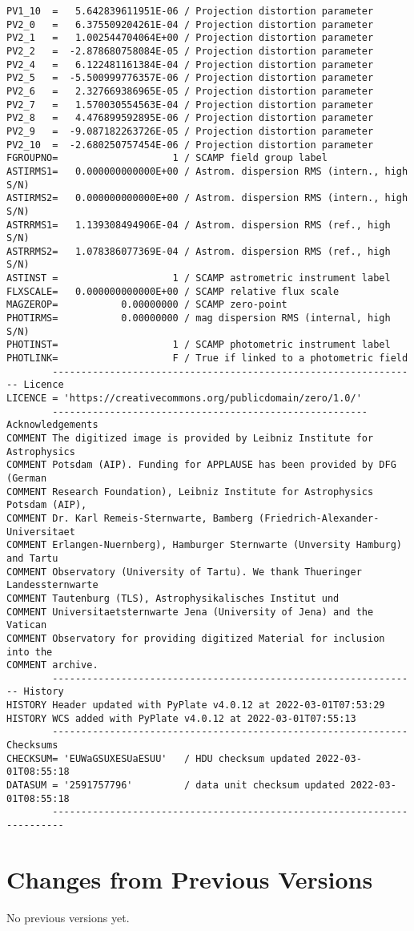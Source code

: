 \documentclass[11pt]{ivoa}
\begin{document}
\begin{lstlisting}
PV1_10  =   5.642839611951E-06 / Projection distortion parameter
PV2_0   =   6.375509204261E-04 / Projection distortion parameter
PV2_1   =   1.002544704064E+00 / Projection distortion parameter
PV2_2   =  -2.878680758084E-05 / Projection distortion parameter
PV2_4   =   6.122481161384E-04 / Projection distortion parameter
PV2_5   =  -5.500999776357E-06 / Projection distortion parameter
PV2_6   =   2.327669386965E-05 / Projection distortion parameter
PV2_7   =   1.570030554563E-04 / Projection distortion parameter
PV2_8   =   4.476899592895E-06 / Projection distortion parameter
PV2_9   =  -9.087182263726E-05 / Projection distortion parameter
PV2_10  =  -2.680250757454E-06 / Projection distortion parameter
FGROUPNO=                    1 / SCAMP field group label
ASTIRMS1=   0.000000000000E+00 / Astrom. dispersion RMS (intern., high S/N)
ASTIRMS2=   0.000000000000E+00 / Astrom. dispersion RMS (intern., high S/N)
ASTRRMS1=   1.139308494906E-04 / Astrom. dispersion RMS (ref., high S/N)
ASTRRMS2=   1.078386077369E-04 / Astrom. dispersion RMS (ref., high S/N)
ASTINST =                    1 / SCAMP astrometric instrument label
FLXSCALE=   0.000000000000E+00 / SCAMP relative flux scale
MAGZEROP=           0.00000000 / SCAMP zero-point
PHOTIRMS=           0.00000000 / mag dispersion RMS (internal, high S/N)
PHOTINST=                    1 / SCAMP photometric instrument label
PHOTLINK=                    F / True if linked to a photometric field
        ---------------------------------------------------------------- Licence
LICENCE = 'https://creativecommons.org/publicdomain/zero/1.0/'
        ------------------------------------------------------- Acknowledgements
COMMENT The digitized image is provided by Leibniz Institute for Astrophysics
COMMENT Potsdam (AIP). Funding for APPLAUSE has been provided by DFG (German
COMMENT Research Foundation), Leibniz Institute for Astrophysics Potsdam (AIP),
COMMENT Dr. Karl Remeis-Sternwarte, Bamberg (Friedrich-Alexander-Universitaet
COMMENT Erlangen-Nuernberg), Hamburger Sternwarte (Unversity Hamburg) and Tartu
COMMENT Observatory (University of Tartu). We thank Thueringer Landessternwarte
COMMENT Tautenburg (TLS), Astrophysikalisches Institut und
COMMENT Universitaetsternwarte Jena (University of Jena) and the Vatican
COMMENT Observatory for providing digitized Material for inclusion into the
COMMENT archive.
        ---------------------------------------------------------------- History
HISTORY Header updated with PyPlate v4.0.12 at 2022-03-01T07:53:29
HISTORY WCS added with PyPlate v4.0.12 at 2022-03-01T07:55:13
        -------------------------------------------------------------- Checksums
CHECKSUM= 'EUWaGSUXESUaESUU'   / HDU checksum updated 2022-03-01T08:55:18
DATASUM = '2591757796'         / data unit checksum updated 2022-03-01T08:55:18
        ------------------------------------------------------------------------
\end{lstlisting}


\appendix
\section{Changes from Previous Versions}

No previous versions yet.  



\end{document}
